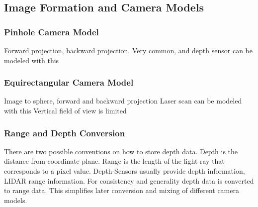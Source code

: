 \subsection{Image Formation and Camera Models}

\subsubsection{Pinhole Camera Model}

Forward projection, backward projection.
Very common, and depth sensor can be modeled with this

\subsubsection{Equirectangular Camera Model}

Image to sphere, forward and backward projection
Laser scan can be modeled with this
Vertical field of view is limited

\subsubsection{Range and Depth Conversion}

There are two possible conventions on how to store depth data.
Depth is the distance from coordinate plane.
Range is the length of the light ray that corresponds to a pixel value.
Depth-Sensors usually provide depth information, LIDAR range information.
For consistency and generality depth data is converted to range data.
This simplifies later conversion and mixing of different camera models.


